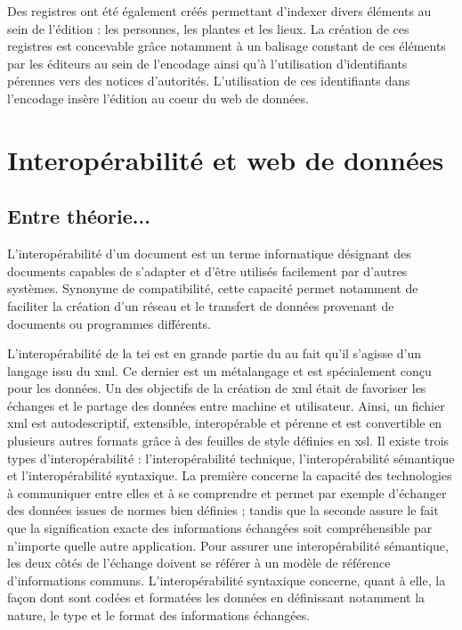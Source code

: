 \documentclass[a4paper, 12pt, twoside]{book}
\begin{document}
Des registres ont été également créés permettant d'indexer divers éléments au sein de l'édition : les personnes, les plantes et les lieux. La création de ces registres est concevable grâce notamment à un balisage constant de ces éléments par les éditeurs au sein de l'encodage ainsi qu'à l'utilisation d'identifiants pérennes vers des notices d'autorités. L'utilisation de ces identifiants dans l'encodage insère l'édition au coeur du web de données.

\section{Interopérabilité et web de données}
\label{sect:interEtLinkedData}
\subsection{Entre théorie...}
L'interopérabilité d'un document est un terme informatique désignant des documents capables de s'adapter et d'être utilisés facilement par d'autres systèmes. Synonyme de compatibilité, cette capacité permet notamment de faciliter la création d'un réseau et le transfert de données provenant de documents ou programmes différents.

L'interopérabilité de la \gls{tei} est en grande partie du au fait qu'il s'agisse d'un langage issu du \gls{xml}. Ce dernier est un métalangage et est spécialement conçu pour les données. Un des objectifs de la création de \gls{xml} était de favoriser les échanges et le partage des données entre machine et utilisateur. Ainsi, un fichier \gls{xml} est autodescriptif, extensible, interopérable et pérenne et est convertible en plusieurs autres formats grâce à des feuilles de style définies en \gls{xsl}. Il existe trois types d'interopérabilité : l'interopérabilité technique, l'interopérabilité sémantique et l'interopérabilité syntaxique. La première concerne la capacité des technologies à communiquer entre elles et à se comprendre et permet par exemple d'échanger des données  issues de normes bien définies ; tandis que la seconde assure le fait que la signification exacte des informations échangées soit compréhensible par n'importe quelle autre application. Pour assurer une interopérabilité sémantique, les deux côtés de l'échange doivent se référer à un modèle de référence d'informations communs. L'interopérabilité syntaxique concerne, quant à elle, la façon dont sont codées et formatées les données en définissant notamment la nature, le type et le format des informations échangées. 
\end{document}
